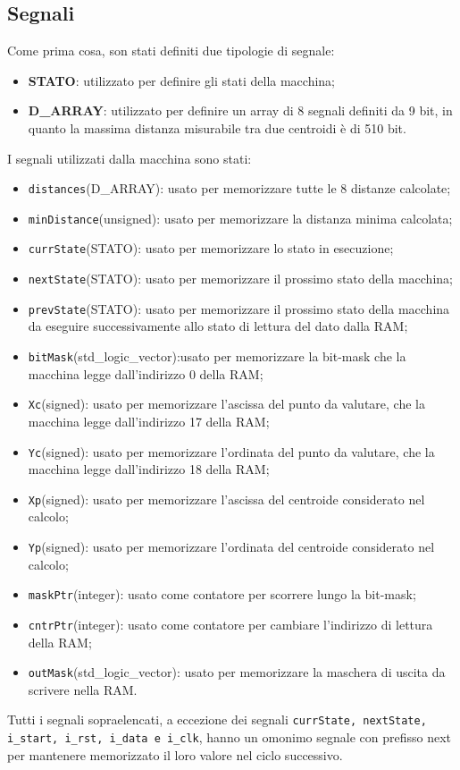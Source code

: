 \documentclass[a4paper,12pt]{article}
\begin{document}
\subsection{Segnali}
Come prima cosa, son stati definiti due tipologie di segnale:
\begin{itemize}
\item \textbf{STATO}: utilizzato per definire gli stati della macchina;
\item \textbf{D\_ARRAY}: utilizzato per definire un array di 8 segnali definiti da 9 bit, in quanto la massima distanza misurabile tra due centroidi è di 510 bit.
\end{itemize}
I segnali utilizzati dalla macchina sono stati:
\begin{itemize}
\item \texttt{distances}(D\_ARRAY): usato per memorizzare tutte le 8 distanze calcolate;
\item \texttt{minDistance}(unsigned): usato per memorizzare la distanza minima calcolata;
\item \texttt{currState}(STATO): usato per memorizzare lo stato in esecuzione;
\item \texttt{nextState}(STATO): usato per memorizzare il prossimo stato della macchina;
\item \texttt{prevState}(STATO): usato per memorizzare il prossimo stato della macchina da eseguire successivamente allo stato di lettura del dato dalla RAM;
\item \texttt{bitMask}(std\_logic\_vector):usato per memorizzare la bit-mask che la macchina legge dall'indirizzo 0 della RAM;
\item \texttt{Xc}(signed): usato per memorizzare l'ascissa del punto da valutare, che la macchina legge dall'indirizzo 17 della RAM;
\item \texttt{Yc}(signed): usato per memorizzare l'ordinata del punto da valutare, che la macchina legge dall'indirizzo 18 della RAM;
\item \texttt{Xp}(signed): usato per memorizzare l'ascissa del centroide considerato nel calcolo;
\item \texttt{Yp}(signed): usato per memorizzare l'ordinata del centroide considerato nel calcolo;
\item \texttt{maskPtr}(integer): usato come contatore per scorrere lungo la bit-mask;
\item \texttt{cntrPtr}(integer): usato come contatore per cambiare l'indirizzo di lettura della RAM;
\item \texttt{outMask}(std\_logic\_vector): usato per memorizzare la maschera di uscita da scrivere nella RAM.
\end{itemize}
Tutti i segnali sopraelencati, a eccezione dei segnali \texttt{currState, nextState, i\_start, i\_rst, i\_data e i\_clk}, hanno un omonimo segnale con prefisso next per mantenere memorizzato il loro valore nel ciclo successivo.
\end{document}
